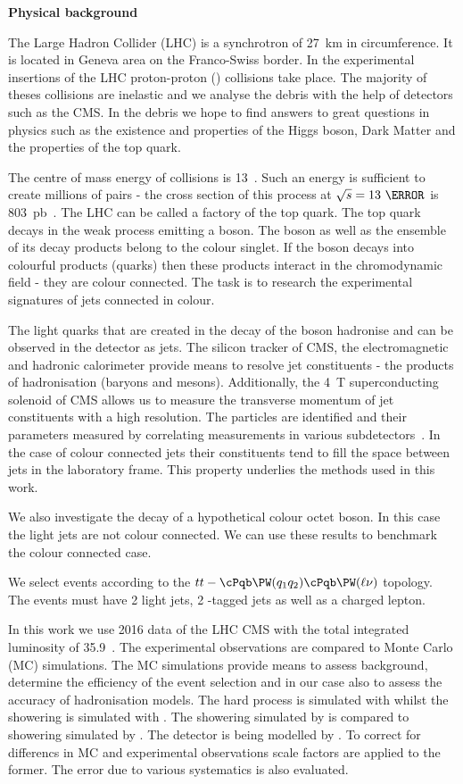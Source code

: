 \vskip 1.5cm
\medskip
\textbf{Physical background}
\nopagebreak\medskip

The Large Hadron Collider (LHC) is a synchrotron of 27~km in circumference. It is located in Geneva area on the Franco-Swiss border. In the experimental insertions of the LHC proton-proton (\Pp\Pp) collisions take place. The majority of theses collisions are inelastic and we analyse the debris with the help of detectors such as the CMS. In the debris we hope to find answers to great questions in physics such as the existence and properties of the Higgs boson, Dark Matter and the properties of the top quark.

The centre of mass energy of \Pp\Pp collisions is 13~\TeV. Such an energy is sufficient to create millions of \ttbar pairs - the cross section of this process at $\sqrt{s}=13~\TeV$ is 803~pb~\cite{Sirunyan:2018goh}. The LHC can be called a factory of the top quark. The top quark decays in the weak process emitting a \PW boson. The \PW boson as well as the ensemble of its decay products belong to the colour singlet. If the \PW boson decays into colourful products (quarks) then these products interact in the chromodynamic field - they are colour connected. The task is to research the experimental signatures of jets connected in colour.

The light quarks that are created in the decay of the \PW boson hadronise and can be observed in the detector as jets. The silicon tracker of CMS, the electromagnetic and hadronic calorimeter provide means to resolve jet constituents - the products of hadronisation (baryons and mesons). Additionally, the 4~T superconducting solenoid of CMS allows us to measure the transverse momentum of jet constituents with a high resolution. The particles are identified and their parameters measured by correlating measurements in various subdetectors~\cite{Sirunyan:2017ulk}. In the case of colour connected jets their constituents tend to fill the space between jets in the laboratory frame. This property underlies the methods used in this work. 

We also investigate the decay of a hypothetical colour octet \PW boson. In this case the light jets are not colour connected. We can use these results to benchmark the colour connected case.

We select events according to the $tt-\cPqb\PW(q_1q_2)\cPqb\PW(\ell\nu)$ topology. The events must have 2 light jets, 2 \cPqb-tagged jets as well as a charged lepton.

In this work we use 2016 data of the LHC CMS with the total integrated luminosity of 35.9~\fbinv. The experimental observations are compared to Monte Carlo (MC) simulations. The MC simulations provide means to assess background, determine the efficiency of the event selection and in our case also to assess the accuracy of hadronisation models. The hard process is simulated with \POWHEG whilst the showering is simulated with \PYTHIA. The showering simulated by \PYTHIA is compared to showering simulated by \HERWIGpp. The detector is being modelled by \GEANTfour. To correct for differencs in MC and experimental observations scale factors are applied to the former. The error due to various systematics is also evaluated. 

